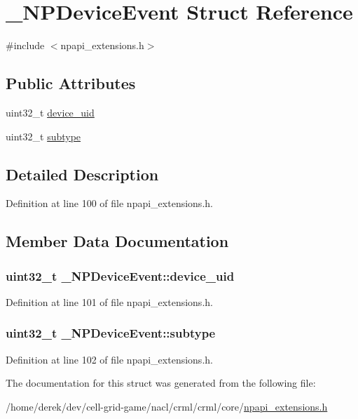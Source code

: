 \hypertarget{struct___n_p_device_event}{
\section{\_\-NPDeviceEvent Struct Reference}
\label{struct___n_p_device_event}
}


{\ttfamily \#include $<$npapi\_\-extensions.h$>$}

\subsection*{Public Attributes}
\begin{DoxyCompactItemize}
\item 
uint32\_\-t \hyperlink{struct___n_p_device_event_a3fdf3b1d49f5717880ebb0714f865271}{device\_\-uid}
\item 
uint32\_\-t \hyperlink{struct___n_p_device_event_ad8659828b3af02ef9e65dbc9fac6b069}{subtype}
\end{DoxyCompactItemize}


\subsection{Detailed Description}


Definition at line 100 of file npapi\_\-extensions.h.



\subsection{Member Data Documentation}
\hypertarget{struct___n_p_device_event_a3fdf3b1d49f5717880ebb0714f865271}{
\subsubsection[{device\_\-uid}]{\setlength{\rightskip}{0pt plus 5cm}uint32\_\-t {\bf \_\-NPDeviceEvent::device\_\-uid}}}
\label{struct___n_p_device_event_a3fdf3b1d49f5717880ebb0714f865271}


Definition at line 101 of file npapi\_\-extensions.h.

\hypertarget{struct___n_p_device_event_ad8659828b3af02ef9e65dbc9fac6b069}{
\subsubsection[{subtype}]{\setlength{\rightskip}{0pt plus 5cm}uint32\_\-t {\bf \_\-NPDeviceEvent::subtype}}}
\label{struct___n_p_device_event_ad8659828b3af02ef9e65dbc9fac6b069}


Definition at line 102 of file npapi\_\-extensions.h.



The documentation for this struct was generated from the following file:\begin{DoxyCompactItemize}
\item 
/home/derek/dev/cell-\/grid-\/game/nacl/crml/crml/core/\hyperlink{npapi__extensions_8h}{npapi\_\-extensions.h}\end{DoxyCompactItemize}
